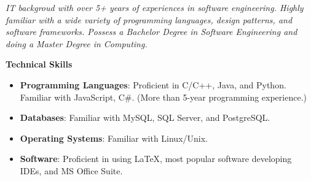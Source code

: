\documentclass{res}
\newcommand{\resheading}[1]{{\normalsize \colorbox{mygrey}{\begin{minipage}{\textwidth}{\textbf{#1 \vphantom{p\^{E}}}}\end{minipage}}}}
\begin{document}
\begin{resume}
\begin{CJK*}{UTF8}{song}
\normalsize

\vspace*{-0.8cm}
\textit{IT backgroud with over 5+ years of experiences in software engineering. Highly familiar with a wide variety of programming languages, design patterns, and software frameworks. Possess a Bachelor Degree in Software Engineering and doing a Master Degree in Computing.}

%



%

\resheading{Technical Skills}
\begin{itemize}
\itemsep -2pt %
  \item{\bf Programming Languages}: Proficient in C/C++, Java, and Python. Familiar with JavaScript, C\#. (More than 5-year programming experience.)
  \item{\bf Databases}: Familiar with MySQL, SQL Server, and PostgreSQL.
  \item{\bf Operating Systems}: Familiar with Linux/Unix.
  \item{\bf Software}: Proficient in using \LaTeX, most popular software developing IDEs, and MS Office Suite.
\end{itemize}




\end{CJK*}
\end{resume}
\end{document}
